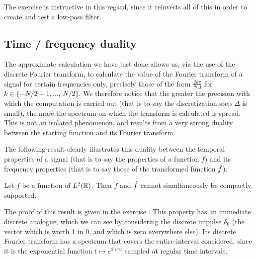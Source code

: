 The exercise  is instructive in this regard, since it reinvests all of this in order to create and test a low-pass filter.
\subsection{Time / frequency duality}
\label{sect2-duality-time-frequency} 
 
 
  The approximate calculation we have just done allows us, via the use of the discrete Fourier transform, to calculate the value of the Fourier transform of a signal for certain frequencies only, precisely those of the form $ \frac{2 k \pi}{N \Delta} $ for $ k \in \{- N / 2 + 1, \ldots, \, N / 2 \} $. We therefore notice that the greater the precision with which the computation is carried out (that is to say the discretization step $ \Delta $ is small), the more the spectrum on which the transform is calculated is spread. This is not an isolated phenomenon, and results from a very strong duality between the starting function and its Fourier transform.
 
 
The following result clearly illustrates this duality between the temporal properties of a signal (that is to say the properties of a function $ f $) and its frequency properties (that is to say those of the transformed function $ \hat{f} $).
 
\begin{prop}
\label{prop-trans-fourier-support-compact}
 Let $ f $ be a function of $ L^2 (\mathbb{R}) $. Then $ f $ and $ \hat{f} $ cannot simultaneously be compactly supported.
\end{prop}
The proof of this result is given in the exercise . This property has an immediate discrete analogue, which we can see by considering the discrete impulse $ \delta_0 $ (the vector which is worth 1 in 0, and which is zero everywhere else). Its discrete Fourier transform has a spectrum that covers the entire interval considered, since it is the exponential function $ t \mapsto e^{2 \imath \pi t} $ sampled at regular time intervals.
